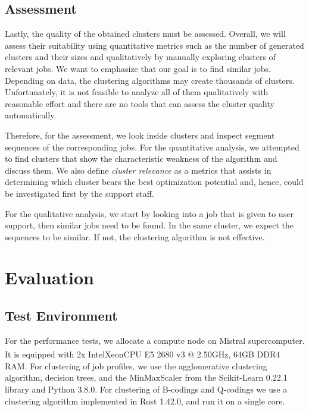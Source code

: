 \documentclass{jhps}
\begin{document}
\subsection{Assessment}
Lastly, the quality of the obtained clusters must be assessed.
Overall, we will assess their suitability using quantitative metrics such as the number of generated clusters and their sizes and qualitatively by manually exploring clusters of relevant jobs.
We want to emphasize that our goal is to find similar jobs.
Depending on data, the clustering algorithms may create thousands of clusters.
Unfortunately, it is not feasible to analyze all of them qualitatively with reasonable effort and there are no tools that can assess the cluster quality automatically.

Therefore, for the assessment, we look inside clusters and inspect segment sequences of the corresponding jobs.
For the quantitative analysis, we attempted to find clusters that show the characteristic weakness of the algorithm and discuss them.
We also define \textit{cluster relevance} as a metrics that assists in determining which cluster bears the best optimization potential and, hence, could be investigated first by the support staff.

For the qualitative analysis, we start by looking into a job that is given to user support, then similar jobs need to be found.
In the same cluster, we expect the sequences to be similar.
If not, the clustering algorithm is not effective.



\section{Evaluation}%
\label{sec:evaluation}

\subsection{Test Environment}%
\label{sec:test_environment}
For the performance tests, we allocate a compute node on Mistral supercomputer.
It is equipped with 2x Intel\textsuperscript\textregistered\@ Xeon\textsuperscript\textregistered\@ CPU E5 2680 v3 @ 2.50GHz, 64GB DDR4 RAM\@.
For clustering of job profiles, we use the agglomerative clustering algorithm, decision trees, and the MinMaxScaler from the Scikit-Learn 0.22.1 library and Python 3.8.0.
For clustering of B-codings and Q-codings we use a clustering algorithm implemented in Rust 1.42.0, and run it on a single core.
\end{document}

